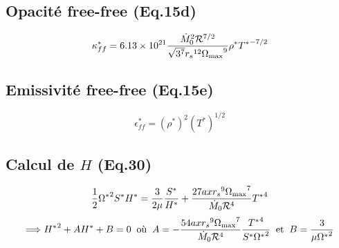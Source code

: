 \documentclass[a4paper,11pt]{article}
\begin{document}
\subsection{Opacité free-free (Eq.15d)}
    \begin{equation}\label{opacite_free_free}
        \kappa_{ff}^* =  6.13 \times 10^{21} \frac{{\dot{M}_0}^2{\mathcal{R}}^{7/2}}{\sqrt{3^7}{r_s}^{12}{\Omega_{\rm{max}}}^9}\rho^*{T^*}^{-7/2}
    \end{equation}

\subsection{Emissivité free-free (Eq.15e)}
    \begin{equation}\label{emissivite_free_free}
        \epsilon_{ff}^* = (\rho^*)^2 (T^*)^{1/2}
    \end{equation}

\subsection{Calcul de $H$ (Eq.30)}
    \begin{equation}\label{calculH}
        \frac{1}{2}{\Omega^*}^2S^*H^*=\frac{3}{2\mu}\frac{S^*}{H^*}+\frac{27ax{r_s}^9{\Omega_{\rm{max}}}^7}{{\dot{M}}_0{\mathcal{R}}^4}{T^*}^4
    \end{equation}
    \begin{equation}
        \Longrightarrow {H^*}^2+AH^*+B=0\;\; \textrm{où} \;\;A=-\frac{54ax{r_s}^9{\Omega_{\rm{max}}}^7}{{\dot{M}}_0{\mathcal{R}}^4}\frac{{T^*}^4}{S^*{\Omega^*}^2}\;\; \textrm{et} \;\;B=\frac{3}{\mu{\Omega^*}^2}
    \end{equation}
\end{document}
